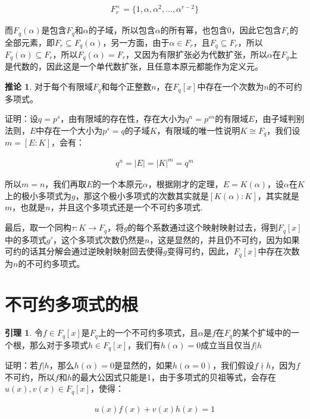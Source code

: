 \documentclass[12pt, a4paper, oneside]{ctexart}
\theoremstyle{definition}
\newtheorem*{lemma}{引理}
\newtheorem*{corollary}{推论}
\begin{document}
\begin{align*}
F_r^{\times }=\{1,\alpha,\alpha^2,...,\alpha^{r-2}\}
\end{align*}

而$F_q(\alpha)$是包含$F_q$和$\alpha$的子域，所以包含$\alpha$的所有幂，也包含0，因此它包含$F_r$的全部元素，即$F_r\subseteq F_q(\alpha)$，另一方面，由于$\alpha \in F_r$，且$F_q\subseteq F_r$，所以$F_q(\alpha)\subseteq F_r$，所以$F_q(\alpha)=F_r$，又因为有限扩张必为代数扩张，所以$\alpha$在$F_q$上是代数的，因此这是一个单代数扩张，且任意本原元都能作为定义元。

\begin{corollary}
对于每个有限域$F_q$和每个正整数$n$，在$F_q[x]$中存在一个次数为$n$的不可约多项式。
\end{corollary}

证明：设$q=p^s$，由有限域的存在性，存在大小为$q^n=p^{sn}$的有限域$E$，由子域判别法则，$E$中存在一个大小为$p^s=q$的子域$K$，有限域的唯一性说明$K\cong F_q$，我们设$m=[E:K]$，会有：

\begin{align*}
q^n=|E|=|K|^m=q^m
\end{align*}

所以$m=n$，我们再取$E$的一个本原元$\alpha$，根据刚才的定理，$E=K(\alpha)$，设$\alpha$在$K$上的极小多项式为$g$，那这个极小多项式的次数其实就是$[K(\alpha):K]$，其实就是$m$，也就是$n$，并且这个多项式还是一个不可约多项式.

最后，取一个同构$\tau: K\rightarrow F_q$，将$g$的每个系数通过这个映射映射过去，得到$F_q[x]$中的多项式$g'$，这个多项式次数仍然是$n$，这是显然的，并且仍不可约，因为如果可约的话其分解会通过逆映射映射回去使得$g$变得可约，因此，$F_q[x]$中存在次数为$n$的不可约多项式。

\section*{不可约多项式的根}

\begin{lemma}
令$f\in F_q[x]$是$F_q$上的一个不可约多项式，且$\alpha$是$f$在$F_q$的某个扩域中的一个根，那么对于多项式$h\in F_q[x]$，我们有$h(\alpha)=0$成立当且仅当$f|h$
\end{lemma}

证明：若$f|h$，那么$h(\alpha)=0$是显然的，如果$h(\alpha=0)$，我们假设$f\nmid h$，因为$f$不可约，所以$f$和$h$的最大公因式只能是1，由于多项式的贝祖等式，会存在$u(x),v(x)\in F_q[x]$，使得：

\begin{align*}
u(x)f(x)+v(x)h(x)=1
\end{align*}
\end{document}

